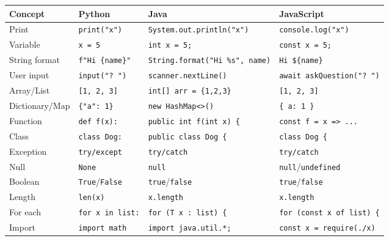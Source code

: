 \documentclass[
  justified,
  openright,
]{tufte-book}
\begin{document}
{\def\LTcaptype{none} %
\begin{longtable}[]{@{}
  >{\raggedright\arraybackslash}p{}
  >{\raggedright\arraybackslash}p{}
  >{\raggedright\arraybackslash}p{}
  >{\raggedright\arraybackslash}p{}@{}}
\toprule\noalign{}
\begin{minipage}[b]{\linewidth}\raggedright
Concept
\end{minipage} & \begin{minipage}[b]{\linewidth}\raggedright
Python
\end{minipage} & \begin{minipage}[b]{\linewidth}\raggedright
Java
\end{minipage} & \begin{minipage}[b]{\linewidth}\raggedright
JavaScript
\end{minipage} \\
\midrule\noalign{}
\endhead
\bottomrule\noalign{}
\endlastfoot
Print & \texttt{print("x")} & \texttt{System.out.println("x")} &
\texttt{console.log("x")} \\
Variable & \texttt{x\ =\ 5} & \texttt{int\ x\ =\ 5;} &
\texttt{const\ x\ =\ 5;} \\
String format & \texttt{f"Hi\ \{name\}"} &
\texttt{String.format("Hi\ \%s",\ name)} &
\texttt{\textasciigrave{}Hi\ \$\{name\}\textasciigrave{}} \\
User input & \texttt{input("?\ ")} & \texttt{scanner.nextLine()} &
\texttt{await\ askQuestion("?\ ")} \\
Array/List & \texttt{{[}1,\ 2,\ 3{]}} &
\texttt{int{[}{]}\ arr\ =\ \{1,2,3\}} & \texttt{{[}1,\ 2,\ 3{]}} \\
Dictionary/Map & \texttt{\{"a":\ 1\}} &
\texttt{new\ HashMap\textless{}\textgreater{}()} &
\texttt{\{\ a:\ 1\ \}} \\
Function & \texttt{def\ f(x):} & \texttt{public\ int\ f(int\ x)\ \{} &
\texttt{const\ f\ =\ x\ =\textgreater{}\ ...} \\
Class & \texttt{class\ Dog:} & \texttt{public\ class\ Dog\ \{} &
\texttt{class\ Dog\ \{} \\
Exception & \texttt{try/except} & \texttt{try/catch} &
\texttt{try/catch} \\
Null & \texttt{None} & \texttt{null} &
\texttt{null}/\texttt{undefined} \\
Boolean & \texttt{True}/\texttt{False} & \texttt{true}/\texttt{false} &
\texttt{true}/\texttt{false} \\
Length & \texttt{len(x)} & \texttt{x.length} & \texttt{x.length} \\
For each & \texttt{for\ x\ in\ list:} &
\texttt{for\ (T\ x\ :\ list)\ \{} &
\texttt{for\ (const\ x\ of\ list)\ \{} \\
Import & \texttt{import\ math} & \texttt{import\ java.util.*;} &
\texttt{const\ x\ =\ require(\textquotesingle{}./x\textquotesingle{})} \\
\end{longtable}
}
\end{document}
